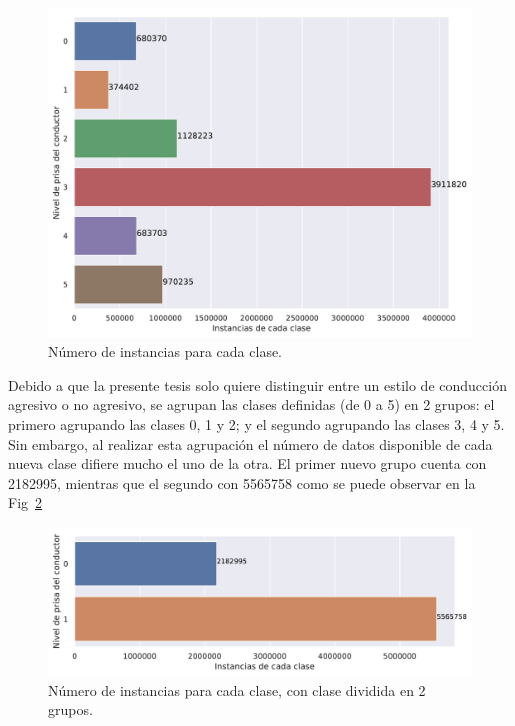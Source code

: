 \begin{figure}[hbt!]
\centering
\includegraphics[width=\textwidth]{instancia_clases.pdf}
\caption{Número de instancias para cada clase.}
\label{fig:numeros_clases}
\end{figure}

Debido a que la presente tesis solo quiere distinguir entre un estilo de conducción agresivo o no agresivo, se agrupan las clases definidas (de 0 a 5) en 2 grupos: el primero agrupando las clases 0, 1 y 2; y el segundo agrupando las clases 3, 4 y 5. Sin embargo, al realizar esta agrupación el número de datos disponible de cada nueva clase difiere mucho el uno de la otra. El primer nuevo grupo cuenta con \num{2182995}, mientras que el segundo con \num{5565758} como se puede observar en la Fig~\ref{fig:numeros_clases_2}

\begin{figure}[hbt!]
\centering
\includegraphics[width=\textwidth]{instancia_clases_2.pdf}
\caption{Número de instancias para cada clase, con clase dividida en 2 grupos.}
\label{fig:numeros_clases_2}
\end{figure}


